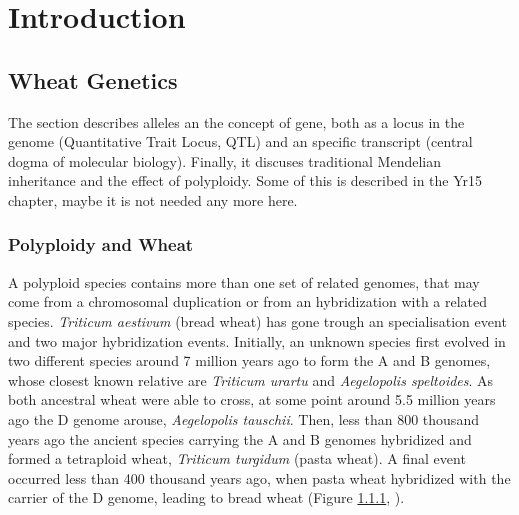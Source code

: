 

\chapter{Introduction}



\section{Wheat Genetics}
The section describes alleles an the concept of gene, both as a locus in the genome (Quantitative Trait Locus, QTL) and an specific transcript (central dogma of molecular biology). Finally, it discuses traditional Mendelian inheritance and the effect of polyploidy.  Some of this is described in the Yr15 chapter, maybe it is not needed any more here. 


\subsection{Polyploidy and Wheat}
\label{lit:polyploidy}

A polyploid species contains more than one set of related genomes, that may come from a chromosomal duplication or from an hybridization with a related species. 
\textit{Triticum aestivum} (bread wheat) has gone trough an specialisation event and two major hybridization events. 
Initially, an unknown species first evolved in two different species around 7 million years ago to form the A and B genomes, whose closest known relative are \textit{Triticum urartu} and \textit{Aegelopolis speltoides}. 
As both ancestral wheat were able to cross, at some point around 5.5 million years ago the D genome arouse, \textit{Aegelopolis tauschii}. 
Then, less than 800 thousand years ago the ancient species carrying the  A and B genomes hybridized and formed a tetraploid wheat, \textit{Triticum turgidum} (pasta wheat). 
A final event occurred less than 400 thousand years ago, when pasta wheat hybridized with the carrier of the D genome, leading to bread wheat (Figure \ref{lit:polyploidy}, \citealt{Marcussen2014}).  

